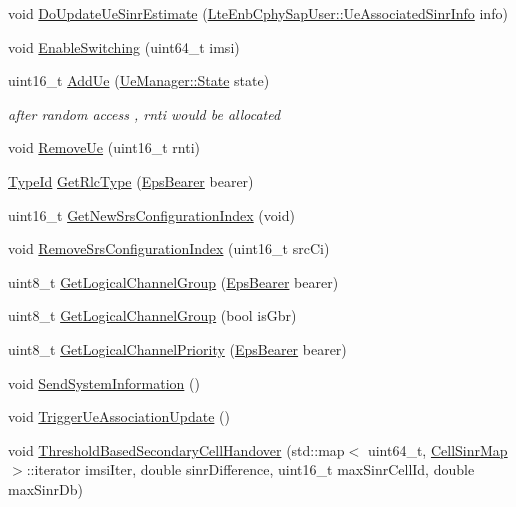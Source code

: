 \begin{DoxyCompactItemize}
void \hyperlink{classns3_1_1LteEnbRrc_a8f7223eddd3898a70f5291d7a4e34de1}{Do\+Update\+Ue\+Sinr\+Estimate} (\hyperlink{structns3_1_1LteEnbCphySapUser_1_1UeAssociatedSinrInfo}{Lte\+Enb\+Cphy\+Sap\+User\+::\+Ue\+Associated\+Sinr\+Info} info)
\item 
void \hyperlink{classns3_1_1LteEnbRrc_ae884d1645218a83bcd7f18002bd6ea08}{Enable\+Switching} (uint64\+\_\+t imsi)
\item 
uint16\+\_\+t \hyperlink{classns3_1_1LteEnbRrc_a7e7972444b688ab643bb1ff3122012d3}{Add\+Ue} (\hyperlink{classns3_1_1UeManager_a2f4085fdd18d7125c27da44a5b8b6808}{Ue\+Manager\+::\+State} state)
\begin{DoxyCompactList}\small\item\em after random access , rnti would be allocated \end{DoxyCompactList}\item 
void \hyperlink{classns3_1_1LteEnbRrc_a0e507111feeaf6e7f34555b6141525f7}{Remove\+Ue} (uint16\+\_\+t rnti)
\item 
\hyperlink{classns3_1_1TypeId}{Type\+Id} \hyperlink{classns3_1_1LteEnbRrc_ab53197554f28b4e2589b1ae88301ece6}{Get\+Rlc\+Type} (\hyperlink{structns3_1_1EpsBearer}{Eps\+Bearer} bearer)
\item 
uint16\+\_\+t \hyperlink{classns3_1_1LteEnbRrc_ae3fdb8d14a66bbfeb62b060bd51074d3}{Get\+New\+Srs\+Configuration\+Index} (void)
\item 
void \hyperlink{classns3_1_1LteEnbRrc_af6895c64bf0626b4f0a6076a1e74f3b5}{Remove\+Srs\+Configuration\+Index} (uint16\+\_\+t src\+Ci)
\item 
uint8\+\_\+t \hyperlink{classns3_1_1LteEnbRrc_a1565c60165d689a549d203d6fa016d65}{Get\+Logical\+Channel\+Group} (\hyperlink{structns3_1_1EpsBearer}{Eps\+Bearer} bearer)
\item 
uint8\+\_\+t \hyperlink{classns3_1_1LteEnbRrc_a5dbacb616271d48c817582a3a9a1e40e}{Get\+Logical\+Channel\+Group} (bool is\+Gbr)
\item 
uint8\+\_\+t \hyperlink{classns3_1_1LteEnbRrc_a59e43e22338f7e21ce40492ff12e7256}{Get\+Logical\+Channel\+Priority} (\hyperlink{structns3_1_1EpsBearer}{Eps\+Bearer} bearer)
\item 
void \hyperlink{classns3_1_1LteEnbRrc_a1b65dfc2b14c899003aa0bd4c50b957f}{Send\+System\+Information} ()
\item 
void \hyperlink{classns3_1_1LteEnbRrc_a57692ec9ada180d2887bd4273b27b6ef}{Trigger\+Ue\+Association\+Update} ()
\item 
void \hyperlink{classns3_1_1LteEnbRrc_a03410d7e5f0a8d10c0d641b7444757a3}{Threshold\+Based\+Secondary\+Cell\+Handover} (std\+::map$<$ uint64\+\_\+t, \hyperlink{namespacens3_a1a41652a34d3ad5a6fb5d9a0f57e29f8}{Cell\+Sinr\+Map} $>$\+::iterator imsi\+Iter, double sinr\+Difference, uint16\+\_\+t max\+Sinr\+Cell\+Id, double max\+Sinr\+Db)

\end{DoxyCompactItemize}
